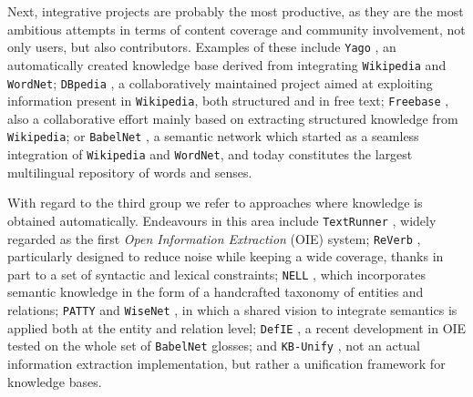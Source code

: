 Next, integrative projects are probably the most productive, as they are the most ambitious attempts in terms of content coverage and community involvement, not only users, but also contributors. Examples of these include \texttt{Yago} \citep{Suchaneketal2007}, an automatically created knowledge base derived from integrating \texttt{Wikipedia} and \texttt{WordNet}; \texttt{DBpedia} \citep{Lehmanetal2014}, a collaboratively maintained project aimed at exploiting information present in \texttt{Wikipedia}, both structured and in free text; \texttt{Freebase} \citep{Bollacketal2008}, also a collaborative effort mainly based on extracting structured knowledge from \texttt{Wikipedia}; or \texttt{BabelNet} \citep{NavigliPonzetto2012}, a semantic network which started as a seamless integration of \texttt{Wikipedia} and \texttt{WordNet}, and today constitutes the largest multilingual repository of words and senses.

With regard to the third group we refer to approaches where knowledge is obtained automatically. 
Endeavours in this area include \texttt{TextRunner} \citep{Bankoetal2007}, widely regarded as the first \textit{Open Information Extraction} (OIE) system; \texttt{ReVerb} \citep{Fader2011}, particularly designed to reduce noise while keeping a wide coverage, thanks in part to a set of syntactic and lexical constraints; \texttt{NELL} \citep{Carlson2010}, which incorporates semantic knowledge in the form of a handcrafted taxonomy of entities and relations; \texttt{PATTY} \citep{Nakasholeetal2012} and \texttt{WiseNet} \citep{MoroandNavigli2012,MoroandNavigli2013}, in which a shared vision to integrate semantics is applied both at the entity and relation level; \texttt{DefIE} \citep{DelliBovietal2015b}, a recent development in OIE tested on the whole set of \texttt{BabelNet} glosses; and \texttt{KB-Unify} \citep{DelliBovietal2015}, not an actual information extraction implementation, but rather a unification framework for knowledge bases.


